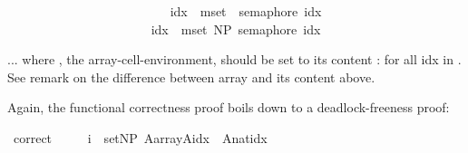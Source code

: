 \begin{isabellebody}
\ \ \ \ \ \ \ \ \ \ \ \ {\isacharbar}{\kern0pt}{\isacharbar}{\kern0pt}{\isacharbar}{\kern0pt}\isanewline
\ \ \ \ \ \ \ \ \ \ \ \ \isactrlbold {\isacharbar}{\kern0pt}\isactrlbold {\isacharbar}{\kern0pt}\isactrlbold {\isacharbar}{\kern0pt}\ idx\ {\isasymin}{\isacharhash}{\kern0pt}\ mset\ {\isacharbrackleft}{\kern0pt}{}{\isachardot}{\kern0pt}{\isachardot}{\kern0pt}{}{\isacharbrackright}{\kern0pt}{\isachardot}{\kern0pt}\ semaphore\ idx\ {\isacharparenright}{\kern0pt}\ \ \isanewline
\ \ \ \ \ \ \ \ \ \ \ \ \ \ \ \ \ \isanewline
\ \ \ \ \ \ \ \ \ \ {\isacharbar}{\kern0pt}{\isacharbar}{\kern0pt}\isanewline
\isanewline
\ \ \ \ \ \ \ \ \ \ {\isacharparenleft}{\kern0pt}\ \isactrlbold {\isacharbar}{\kern0pt}\isactrlbold {\isacharbar}{\kern0pt}\isactrlbold {\isacharbar}{\kern0pt}\ idx\ {\isasymin}{\isacharhash}{\kern0pt}\ mset\ {\isacharbrackleft}{\kern0pt}{}{\isachardot}{\kern0pt}{\isachardot}{\kern0pt}NP{\isacharbrackright}{\kern0pt}{\isachardot}{\kern0pt}\ semaphore\ idx\ {\isacharparenright}{\kern0pt}{\isachardoublequoteclose}%
\begin{isamarkuptext}%
... where , the array-cell-environment, should be set to its content : 
      for all idx in . 
     See remark on the difference between array and its content above.%
\end{isamarkuptext}\isamarkuptrue%
%
\begin{isamarkuptext}%
Again, the functional correctness proof boils down to a deadlock-freeness proof:%
\end{isamarkuptext}\isamarkuptrue%
\isamarkupfalse%
\ correct{\isacharcolon}{\kern0pt}\ \isanewline
\ \ \ {\isacartoucheopen}{\isasymforall}\ i\ {\isasymin}\ set{\isacharbrackleft}{\kern0pt}{}{\isachardot}{\kern0pt}{\isachardot}{\kern0pt}NP{\isacharbrackright}{\kern0pt}{\isachardot}{\kern0pt}\ A{\isacharprime}{\kern0pt}{\isacharparenleft}{\kern0pt}array{\isacharparenleft}{\kern0pt}{\isacharprime}{\kern0pt}{\isacharprime}{\kern0pt}A{\isacharprime}{\kern0pt}{\isacharprime}{\kern0pt}{\isacharcomma}{\kern0pt}idx{\isacharparenright}{\kern0pt}{\isacharparenright}{\kern0pt}\ {\isacharequal}{\kern0pt}\ A{\isacharbang}{\kern0pt}{\isacharparenleft}{\kern0pt}nat{\isacharparenleft}{\kern0pt}idx{\isacharminus}{\kern0pt}{}{\isacharparenright}{\kern0pt}{\isacharparenright}{\kern0pt}{\isacartoucheclose}\ \isanewline

\end{isabellebody}
